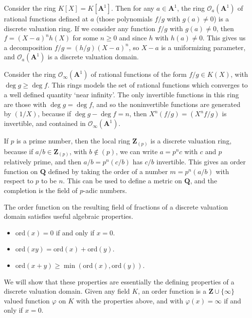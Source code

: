 \begin{example}
    Consider the ring $K[X] = K[\mathbf{A}^1]$. Then for any $a \in \mathbf{A}^1$, the ring $\mathcal{O}_a(\mathbf{A}^1)$ of rational functions defined at $a$ (those polynomials $f/g$ with $g(a) \neq 0$) is a discrete valuation ring. If we consider any function $f/g$ with $g(a) \neq 0$, then $f = (X-a)^nh(X)$ for some $n \geq 0$ and since $h$ with $h(a) \neq 0$. This gives us a decomposition $f/g = (h/g)(X-a)^n$, so $X - a$ is a uniformizing parameter, and $\mathcal{O}_a(\mathbf{A}^1)$ is a discrete valuation domain.
\end{example}

\begin{example}
    Consider the ring $\mathcal{O}_\infty(\mathbf{A}^1)$ of rational functions of the form $f/g \in K(X)$, with $\deg g \geq \deg f$. This rings models the set of rational functions which converges to a well defined quantity `near infinity'. The only invertible functions in this ring are those with $\deg g = \deg f$, and so the noninvertible functions are generated by $(1/X)$, because if $\deg g - \deg f = n$, then $X^n (f/g) = (X^nf/g)$ is invertible, and contained in $\mathcal{O}_\infty(\mathbf{A}^1)$.
\end{example}

\begin{example}
    If $p$ is a prime number, then the local ring $\mathbf{Z}_{(p)}$ is a discrete valuation ring, because if $a/b \in \mathbf{Z}_{(p)}$, with $b \not \in (p)$, we can write $a = p^nc$ with $c$ and $p$ relatively prime, and then $a/b = p^n (c/b)$ has $c/b$ invertible. This gives an order function on $\mathbf{Q}$ defined by taking the order of a number $m = p^n(a/b)$ with respect to $p$ to be $n$. This can be used to define a metric on $\mathbf{Q}$, and the completion is the field of $p$-adic numbers.
\end{example}

The order function on the resulting field of fractions of a discrete valuation domain satisfies useful algebraic properties.
%
\begin{itemize}
    \item $\text{ord}(x) = 0$ if and only if $x = 0$.
    \item $\text{ord}(xy) = \text{ord}(x) + \text{ord}(y)$.
    \item $\text{ord}(x + y) \geq \min(\text{ord}(x), \text{ord}(y))$.
\end{itemize}
%
We will show that these properties are essentially the defining properties of a discrete valuation domain. Given any field $K$, an order function is a $\mathbf{Z} \cup \{ \infty \}$ valued function $\varphi$ on $K$ with the properties above, and with $\varphi(x) = \infty$ if and only if $x = 0$.

